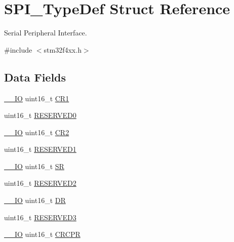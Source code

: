 \hypertarget{struct_s_p_i___type_def}{\section{S\-P\-I\-\_\-\-Type\-Def Struct Reference}
\label{struct_s_p_i___type_def}
}


Serial Peripheral Interface.  




{\ttfamily \#include $<$stm32f4xx.\-h$>$}

\subsection*{Data Fields}
\begin{DoxyCompactItemize}
\item 
\hyperlink{group___c_m_s_i_s__core__definitions_gaec43007d9998a0a0e01faede4133d6be}{\-\_\-\-\_\-\-I\-O} uint16\-\_\-t \hyperlink{struct_s_p_i___type_def_a61400ce239355b62aa25c95fcc18a5e1}{C\-R1}
\item 
uint16\-\_\-t \hyperlink{struct_s_p_i___type_def_a149feba01f9c4a49570c6d88619f504f}{R\-E\-S\-E\-R\-V\-E\-D0}
\item 
\hyperlink{group___c_m_s_i_s__core__definitions_gaec43007d9998a0a0e01faede4133d6be}{\-\_\-\-\_\-\-I\-O} uint16\-\_\-t \hyperlink{struct_s_p_i___type_def_a2a3e81bd118d1bc52d24a0b0772e6a0c}{C\-R2}
\item 
uint16\-\_\-t \hyperlink{struct_s_p_i___type_def_a8249a3955aace28d92109b391311eb30}{R\-E\-S\-E\-R\-V\-E\-D1}
\item 
\hyperlink{group___c_m_s_i_s__core__definitions_gaec43007d9998a0a0e01faede4133d6be}{\-\_\-\-\_\-\-I\-O} uint16\-\_\-t \hyperlink{struct_s_p_i___type_def_a44962ea5442d203bf4954035d1bfeb9d}{S\-R}
\item 
uint16\-\_\-t \hyperlink{struct_s_p_i___type_def_a5573848497a716a9947fd87487709feb}{R\-E\-S\-E\-R\-V\-E\-D2}
\item 
\hyperlink{group___c_m_s_i_s__core__definitions_gaec43007d9998a0a0e01faede4133d6be}{\-\_\-\-\_\-\-I\-O} uint16\-\_\-t \hyperlink{struct_s_p_i___type_def_a0a1acc0425516ff7969709d118b96a3b}{D\-R}
\item 
uint16\-\_\-t \hyperlink{struct_s_p_i___type_def_a6c3b31022e6f59b800e9f5cc2a89d54c}{R\-E\-S\-E\-R\-V\-E\-D3}
\item 
\hyperlink{group___c_m_s_i_s__core__definitions_gaec43007d9998a0a0e01faede4133d6be}{\-\_\-\-\_\-\-I\-O} uint16\-\_\-t \hyperlink{struct_s_p_i___type_def_a942ae09a7662bad70ef336f2bed43a19}{C\-R\-C\-P\-R}

\end{DoxyCompactItemize}
